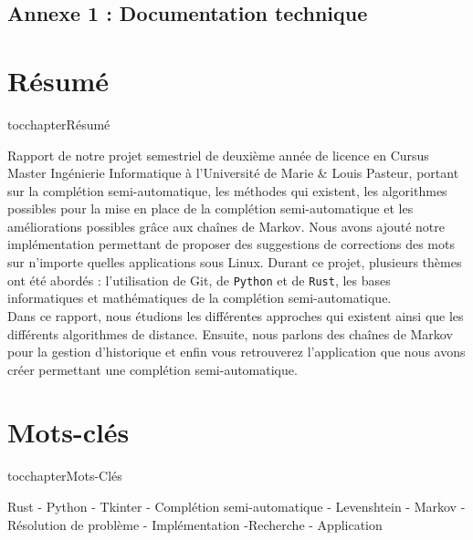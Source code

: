 \documentclass[a4paper, 11pt]{report}
\newcommand{\langage}[1]{\texttt{#1}}
\begin{document}
{%
\pagestyle{annexes}  %

\begin{appendices}  %
	\begingroup
	\centering
	\section*{Annexe 1 : Documentation technique}
	\label{annexe}
	\endgroup
\end{appendices}


\newpage
\begin{center}
	\vspace*{\fill} %
	\section*{Résumé}
	\addcontentsline
	{toc}{chapter}{Résumé}
	\begin{justify}
		Rapport de notre projet semestriel de deuxième année de licence en Cursus Master Ingénierie Informatique à l’Université de Marie \& Louis Pasteur, portant sur la complétion semi-automatique, les méthodes qui existent, les algorithmes possibles pour la mise en place de la complétion semi-automatique et les améliorations possibles grâce aux chaînes de Markov. Nous avons ajouté notre implémentation permettant de proposer des suggestions de corrections des mots sur n'importe quelles applications sous Linux. Durant ce projet, plusieurs thèmes ont été abordés : l'utilisation de Git, de \langage{Python} et de \langage{Rust}, les bases informatiques et mathématiques de la complétion semi-automatique.\\
		Dans ce rapport, nous étudions les différentes approches qui existent ainsi que  les différents algorithmes de distance. Ensuite, nous parlons  des chaînes de Markov pour la gestion d'historique et enfin vous retrouverez l'application que nous avons créer permettant une complétion semi-automatique.

	\end{justify}
	\vspace*{\fill} %

	\section*{Mots-clés}
	\addcontentsline
	{toc}{chapter}{Mots-Clés}
	\begin{justify}
    \centering
		Rust - Python - Tkinter - Complétion semi-automatique - Levenshtein - Markov - Résolution de problème - Implémentation -Recherche - Application
	\end{justify}
	\vspace*{\fill} %


\end{center}}
\end{document}
